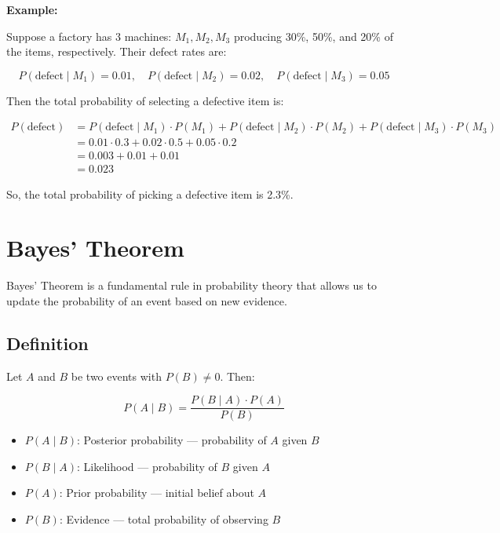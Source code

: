 \documentclass{article}
\begin{document}
\bigskip

\noindent
\textbf{Example:}

Suppose a factory has 3 machines: \( M_1, M_2, M_3 \) producing 30\%, 50\%, and 20\% of the items, respectively. Their defect rates are:

\[
P(\text{defect} \mid M_1) = 0.01, \quad P(\text{defect} \mid M_2) = 0.02, \quad P(\text{defect} \mid M_3) = 0.05
\]

\bigskip

Then the total probability of selecting a defective item is:

\[
\begin{aligned}
P(\text{defect}) &= P(\text{defect} \mid M_1) \cdot P(M_1) + P(\text{defect} \mid M_2) \cdot P(M_2) + P(\text{defect} \mid M_3) \cdot P(M_3) \\
&= 0.01 \cdot 0.3 + 0.02 \cdot 0.5 + 0.05 \cdot 0.2 \\
&= 0.003 + 0.01 + 0.01 \\
&= 0.023
\end{aligned}
\]

So, the total probability of picking a defective item is 2.3\%.

\section{Bayes' Theorem}

Bayes' Theorem is a fundamental rule in probability theory that allows us to update the probability of an event based on new evidence.

\subsection*{Definition}

Let \( A \) and \( B \) be two events with \( P(B) \neq 0 \). Then:

\[
P(A \mid B) = \frac{P(B \mid A) \cdot P(A)}{P(B)}
\]

\begin{itemize}
    \item \( P(A \mid B) \): Posterior probability — probability of \( A \) given \( B \)
    \item \( P(B \mid A) \): Likelihood — probability of \( B \) given \( A \)
    \item \( P(A) \): Prior probability — initial belief about \( A \)
    \item \( P(B) \): Evidence — total probability of observing \( B \)
\end{itemize}
\end{document}
